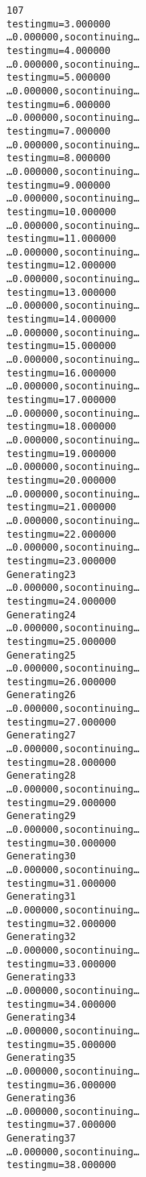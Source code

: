 \documentclass[letterpaper,10pt,english]{/opt/local/Library/Frameworks/Python.framework/Versions/3.3/lib/python3.3/site-packages/Sphinx-1.2.1-py3.3.egg/sphinx/texinputs/sphinxhowto}
\newenvironment{InvisibleVerbatim}
        {\begin{mdframed}[leftmargin=0.1\linewidth,innerleftmargin=3pt,innerrightmargin=3pt, userdefinedwidth=1\linewidth, linewidth=0pt, linecolor=white, usetwoside=false]}
        {\end{mdframed}}
\begin{document}
        

            
                \begin{InvisibleVerbatim}
                \vspace{-0.5\baselineskip}
\begin{alltt}107
testing mu=3.000000
\ldots 0.000000, so continuing\ldots
testing mu=4.000000
\ldots 0.000000, so continuing\ldots
testing mu=5.000000
\ldots 0.000000, so continuing\ldots
testing mu=6.000000
\ldots 0.000000, so continuing\ldots
testing mu=7.000000
\ldots 0.000000, so continuing\ldots
testing mu=8.000000
\ldots 0.000000, so continuing\ldots
testing mu=9.000000
\ldots 0.000000, so continuing\ldots
testing mu=10.000000
\ldots 0.000000, so continuing\ldots
testing mu=11.000000
\ldots 0.000000, so continuing\ldots
testing mu=12.000000
\ldots 0.000000, so continuing\ldots
testing mu=13.000000
\ldots 0.000000, so continuing\ldots
testing mu=14.000000
\ldots 0.000000, so continuing\ldots
testing mu=15.000000
\ldots 0.000000, so continuing\ldots
testing mu=16.000000
\ldots 0.000000, so continuing\ldots
testing mu=17.000000
\ldots 0.000000, so continuing\ldots
testing mu=18.000000
\ldots 0.000000, so continuing\ldots
testing mu=19.000000
\ldots 0.000000, so continuing\ldots
testing mu=20.000000
\ldots 0.000000, so continuing\ldots
testing mu=21.000000
\ldots 0.000000, so continuing\ldots
testing mu=22.000000
\ldots 0.000000, so continuing\ldots
testing mu=23.000000
Generating 23
\ldots 0.000000, so continuing\ldots
testing mu=24.000000
Generating 24
\ldots 0.000000, so continuing\ldots
testing mu=25.000000
Generating 25
\ldots 0.000000, so continuing\ldots
testing mu=26.000000
Generating 26
\ldots 0.000000, so continuing\ldots
testing mu=27.000000
Generating 27
\ldots 0.000000, so continuing\ldots
testing mu=28.000000
Generating 28
\ldots 0.000000, so continuing\ldots
testing mu=29.000000
Generating 29
\ldots 0.000000, so continuing\ldots
testing mu=30.000000
Generating 30
\ldots 0.000000, so continuing\ldots
testing mu=31.000000
Generating 31
\ldots 0.000000, so continuing\ldots
testing mu=32.000000
Generating 32
\ldots 0.000000, so continuing\ldots
testing mu=33.000000
Generating 33
\ldots 0.000000, so continuing\ldots
testing mu=34.000000
Generating 34
\ldots 0.000000, so continuing\ldots
testing mu=35.000000
Generating 35
\ldots 0.000000, so continuing\ldots
testing mu=36.000000
Generating 36
\ldots 0.000000, so continuing\ldots
testing mu=37.000000
Generating 37
\ldots 0.000000, so continuing\ldots
testing mu=38.000000

\end{alltt}
\end{InvisibleVerbatim}
\end{document}
